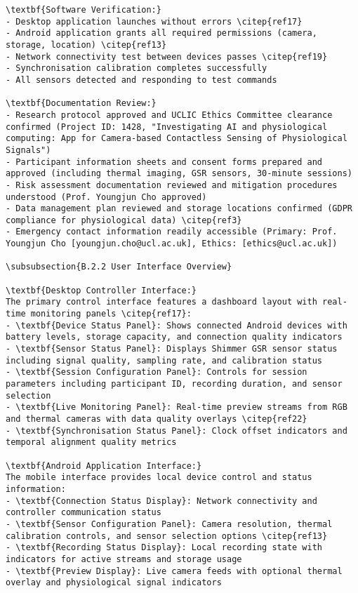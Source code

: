 \begin{verbatim}
\textbf{Software Verification:}
- Desktop application launches without errors \citep{ref17}
- Android application grants all required permissions (camera, storage, location) \citep{ref13}
- Network connectivity test between devices passes \citep{ref19}
- Synchronisation calibration completes successfully
- All sensors detected and responding to test commands

\textbf{Documentation Review:}
- Research protocol approved and UCLIC Ethics Committee clearance confirmed (Project ID: 1428, "Investigating AI and physiological computing: App for Camera-based Contactless Sensing of Physiological Signals")
- Participant information sheets and consent forms prepared and approved (including thermal imaging, GSR sensors, 30-minute sessions)
- Risk assessment documentation reviewed and mitigation procedures understood (Prof. Youngjun Cho approved)
- Data management plan reviewed and storage locations confirmed (GDPR compliance for physiological data) \citep{ref3}
- Emergency contact information readily accessible (Primary: Prof. Youngjun Cho [youngjun.cho@ucl.ac.uk], Ethics: [ethics@ucl.ac.uk])

\subsubsection{B.2.2 User Interface Overview}

\textbf{Desktop Controller Interface:}
The primary control interface features a dashboard layout with real-time monitoring panels \citep{ref17}:
- \textbf{Device Status Panel}: Shows connected Android devices with battery levels, storage capacity, and connection quality indicators
- \textbf{Sensor Status Panel}: Displays Shimmer GSR sensor status including signal quality, sampling rate, and calibration status
- \textbf{Session Configuration Panel}: Controls for session parameters including participant ID, recording duration, and sensor selection
- \textbf{Live Monitoring Panel}: Real-time preview streams from RGB and thermal cameras with data quality overlays \citep{ref22}
- \textbf{Synchronisation Status Panel}: Clock offset indicators and temporal alignment quality metrics

\textbf{Android Application Interface:}
The mobile interface provides local device control and status information:
- \textbf{Connection Status Display}: Network connectivity and controller communication status
- \textbf{Sensor Configuration Panel}: Camera resolution, thermal calibration controls, and sensor selection options \citep{ref13}
- \textbf{Recording Status Display}: Local recording state with indicators for active streams and storage usage
- \textbf{Preview Display}: Live camera feeds with optional thermal overlay and physiological signal indicators


\end{verbatim}
